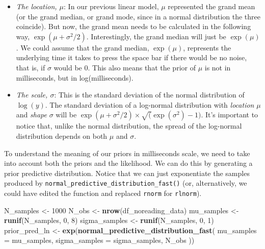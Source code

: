 \documentclass[12pt,]{krantz}
\newenvironment{Shaded}{\begin{snugshade}}{\end{snugshade}}
\newcommand{\DataTypeTok}[1]{\textcolor[rgb]{0.13,0.29,0.53}{#1}}
\newcommand{\DecValTok}[1]{\textcolor[rgb]{0.00,0.00,0.81}{#1}}
\newcommand{\KeywordTok}[1]{\textcolor[rgb]{0.13,0.29,0.53}{\textbf{#1}}}
\newcommand{\NormalTok}[1]{#1}
\newcommand{\StringTok}[1]{\textcolor[rgb]{0.31,0.60,0.02}{#1}}
\providecommand{\tightlist}{%
  \setlength{\itemsep}{0pt}\setlength{\parskip}{0pt}}
\theoremstyle{definition}
\theoremstyle{definition}
\theoremstyle{definition}
\theoremstyle{remark}
\begin{document}
\begin{itemize}
\tightlist
\item
  \emph{The location, \(\mu\)}: In our previous linear model, \(\mu\) represented the grand mean (or the grand median, or grand mode, since in a normal distribution the three coincide). But now, the grand mean needs to be calculated in the following way, \(\exp(\mu +\sigma ^{2}/2)\). Interestingly, the grand median will just be \(\exp(\mu)\). We could assume that the grand median, \(\exp(\mu)\), represents the underlying time it takes to press the space bar if there would be no noise, that is, if \(\sigma\) would be 0. This also means that the prior of \(\mu\) is not in milliseconds, but in log(milliseconds).
\item
  \emph{The scale, \(\sigma\)}: This is the standard deviation of the normal distribution of \(\log(y)\). The standard deviation of a log-normal distribution with \emph{location} \(\mu\) and \emph{shape} \(\sigma\) will be \(\exp(\mu +\sigma ^{2}/2)\times \sqrt(\exp(\sigma^2)- 1)\). It's important to notice that, unlike the normal distribution, the spread of the log-normal distribution depends on both \(\mu\) and \(\sigma\).
\end{itemize}

To understand the meaning of our priors in milliseconds scale, we need to take into account both the priors and the likelihood. We can do this by generating a prior predictive distribution. Notice that we can just exponentiate the samples produced by \texttt{normal\_predictive\_distribution\_fast()} (or, alternatively, we could have edited the function and replaced \texttt{rnorm} for \texttt{rlnorm}).

\begin{Shaded}
\begin{Highlighting}[]
\NormalTok{N_samples <-}\StringTok{ }\DecValTok{1000}
\NormalTok{N_obs <-}\StringTok{ }\KeywordTok{nrow}\NormalTok{(df_noreading_data)}
\NormalTok{mu_samples <-}\StringTok{ }\KeywordTok{runif}\NormalTok{(N_samples, }\DecValTok{0}\NormalTok{, }\DecValTok{8}\NormalTok{)}
\NormalTok{sigma_samples <-}\StringTok{ }\KeywordTok{runif}\NormalTok{(N_samples, }\DecValTok{0}\NormalTok{, }\DecValTok{1}\NormalTok{)}
\NormalTok{prior_pred_ln <-}\StringTok{ }\KeywordTok{exp}\NormalTok{(}\KeywordTok{normal_predictive_distribution_fast}\NormalTok{(}
  \DataTypeTok{mu_samples =}\NormalTok{ mu_samples,}
  \DataTypeTok{sigma_samples =}\NormalTok{ sigma_samples,}
\NormalTok{  N_obs}
\NormalTok{))}
\end{Highlighting}
\end{Shaded}
\end{document}
